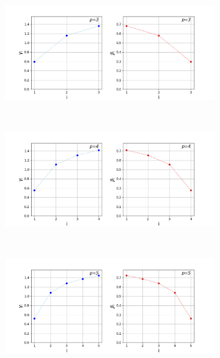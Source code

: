 \newpage
\begin{figure}[H]
	\centering
	\begin{subfigure}[t]{0.7\textwidth}
		\centering
		\includegraphics[width=\textwidth]{figures/interp/patterns/pattern_12-nodal_cyclic_p-3.png}
	\end{subfigure}
	\\
	\centering
	\begin{subfigure}[t]{0.7\textwidth}
		\centering
		\includegraphics[width=\textwidth]{figures/interp/patterns/pattern_12-nodal_cyclic_p-4.png}
	\end{subfigure}
	\\
	\centering
	\begin{subfigure}[t]{0.7\textwidth}
		\centering
		\includegraphics[width=\textwidth]{figures/interp/patterns/pattern_12-nodal_cyclic_p-5.png}

\end{subfigure}
\end{figure}

